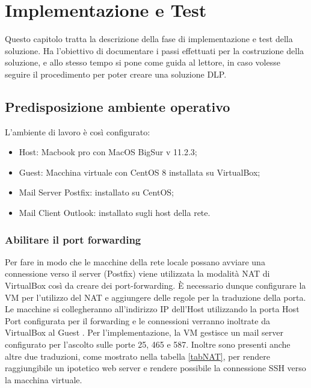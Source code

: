 \chapter{Implementazione e Test}

Questo capitolo tratta la descrizione della fase di implementazione e test della soluzione.
Ha l'obiettivo di documentare i passi effettuati per la costruzione della soluzione, e allo stesso tempo
si pone come guida al lettore, in caso volesse seguire il procedimento per poter creare una soluzione DLP.
\section{Predisposizione ambiente operativo}

L'ambiente di lavoro è così configurato:

\begin{itemize}
    \item Host: Macbook pro con MacOS BigSur v 11.2.3;
    \item Guest: Macchina virtuale con CentOS 8 installata su VirtualBox;
    \item Mail Server Postfix: installato su CentOS;
    \item Mail Client Outlook: installato sugli host della rete.
\end{itemize}

\subsection{Abilitare il port forwarding}
Per fare in modo che le macchine della rete locale possano avviare una connessione
verso il server (Postfix) viene utilizzata la modalità NAT di VirtualBox così da creare dei 
port-forwarding. È necessario dunque configurare la VM per l'utilizzo del NAT e aggiungere delle regole
per la traduzione della porta.
Le macchine si collegheranno all'indirizzo IP dell'Host utilizzando la porta Host Port configurata
per il forwarding e le connessioni verranno inoltrate da VirtualBox al Guest \cite{NAT}.
Per l'implementazione, la VM gestisce un mail server configurato per l'ascolto sulle porte 25, 465 e
587. Inoltre sono presenti anche altre due traduzioni, come mostrato nella tabella \ref{tabNAT}, per rendere raggiungibile un ipotetico web server e rendere possibile
la connessione SSH verso la macchina virtuale.

